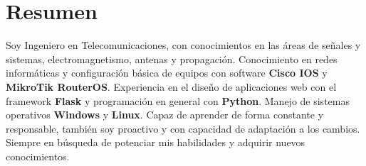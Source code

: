 \documentclass[espanol]{cv-style}     %
\begin{document}
\section{Resumen}
  \vspace{-0.2cm}
Soy Ingeniero en Telecomunicaciones, con conocimientos en las áreas de señales y sistemas, electromagnetismo, antenas y propagación. Conocimiento en redes informáticas y configuración básica de equipos con software \textbf{Cisco IOS} y \textbf{MikroTik RouterOS}. Experiencia en el diseño de aplicaciones web con el framework \textbf{Flask} y programación en general con \textbf{Python}. Manejo de sistemas operativos \textbf{Windows} y \textbf{Linux}. Capaz de aprender de forma constante y responsable, también soy proactivo y con capacidad de adaptación a los cambios. Siempre en búsqueda de potenciar mis habilidades y adquirir nuevos conocimientos.
\end{document}
